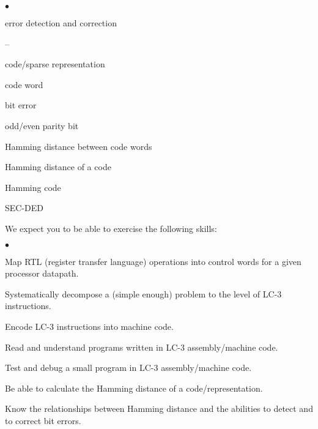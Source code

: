\begin{minipage}[t]{3in}
\begin{list}{$\bullet$}{\setlength{\itemsep}{0pt}\setlength{\parskip}{0pt}%
\setlength{\topsep}{0pt}\setlength{\partopsep}{0pt}\setlength{\parsep}{0pt}}
\item{error detection and correction
\begin{list}{--}{\setlength{\itemsep}{0pt}\setlength{\parskip}{0pt}%
\setlength{\topsep}{0pt}\setlength{\partopsep}{0pt}\setlength{\parsep}{0pt}}
\item code/sparse representation
\item code word
\item bit error
\item odd/even parity bit
\item Hamming distance between code words
\item Hamming distance of a code
\item Hamming code
\item SEC-DED
\end{list}
}

\end{list}

\end{minipage}

\vfill
\vfill
\vfill
\vfill

\pagebreak

We expect you to be able to exercise the following skills:

\begin{list}{$\bullet$}{\setlength{\itemsep}{0pt}\setlength{\parskip}{0pt}%
\setlength{\topsep}{0pt}\setlength{\partopsep}{0pt}\setlength{\parsep}{0pt}}

%

\item{Map RTL (register transfer language) operations into control words
for a given processor datapath.}

\item{Systematically decompose a (simple enough) problem to the level 
of \mbox{LC-3} instructions.}

\item{Encode \mbox{LC-3} instructions into machine code.}

\item{Read and understand programs written in \mbox{LC-3} assembly/machine code.}

\item{Test and debug a small program in \mbox{LC-3} assembly/machine code.}

\item{Be able to calculate the Hamming distance of a code/representation.}

\item{Know the relationships between Hamming distance and the abilities
to detect and to correct bit errors.}

\end{list}

